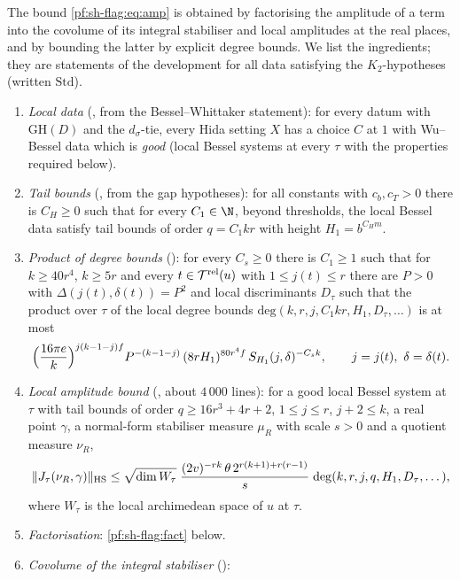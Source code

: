 The bound \eqref{pf:sh-flag:eq:amp} is obtained by factorising the amplitude of a term into the covolume of its integral
stabiliser and local amplitudes at the real places, and by bounding the latter by explicit degree bounds. We list the
ingredients; they are statements of the development for all data satisfying the $K_2$-hypotheses (written $\mathrm{Std}$).
\begin{enumerate}[label=(A\arabic*)]
\item\label{pf:sh-flag:A1} \emph{Local data} (, from the
Bessel--Whittaker statement): for every datum with $\mathrm{GH}(D)$ and the $d_\sigma$-tie, every Hida setting $X$ has a choice
$C$ at $1$ with Wu--Bessel data which is \emph{good} (local Bessel systems at every $\tau$ with the properties required
below).
\item\label{pf:sh-flag:A2} \emph{Tail bounds} (, from the gap
hypotheses): for all constants with $c_b,c_T>0$ there is $C_H\ge0$ such that for every $C_1\in\N$, beyond thresholds, the
local Bessel data satisfy tail bounds of order $q=C_1kr$ with height $H_1=b^{C_Hm}$.
\item\label{pf:sh-flag:A3} \emph{Product of degree bounds} (): for
every $C_s\ge0$ there is $C_1\ge1$ such that for $k\ge40r^4$, $k\ge5r$ and every $t\in\mathcal T^{\mathrm{rel}}(u)$ with $1\le j(t)\le r$ there
are $P>0$ with $\Delta(j(t),\delta(t))=P^2$ and local discriminants $D_\tau$ such that the product over $\tau$ of the local
degree bounds $\mathrm{deg}(k,r,j,C_1kr,H_1,D_\tau,\dots)$ is at most
\[
\Bigl(\frac{16\pi e}k\Bigr)^{j(k-1-j)f}P^{-(k-1-j)}\,(8rH_1)^{80r^4f}\,S_{H_1}(j,\delta)^{-C_sk},\qquad j=j(t),\ \delta=\delta(t).
\]
\item\label{pf:sh-flag:A4} \emph{Local amplitude bound} (,
about $4\,000$ lines): for a good local Bessel system at $\tau$ with tail bounds of order $q\ge16r^3+4r+2$, $1\le j\le r$,
$j+2\le k$, a real point $\gamma$, a normal-form stabiliser measure $\mu_R$ with scale $s>0$ and a quotient measure $\nu_R$,
\[
\|J_\tau(\nu_R,\gamma)\|_{\mathrm{HS}}\le\sqrt{\dim W_\tau}\;\frac{(2v)^{-rk}\,\theta\,2^{r(k+1)+r(r-1)}}s\;
\mathrm{deg}(k,r,j,q,H_1,D_\tau,\dots),
\]
where $W_\tau$ is the local archimedean space of $u$ at $\tau$.
\item\label{pf:sh-flag:A5} \emph{Factorisation}: \cref{pf:sh-flag:fact} below.
\item\label{pf:sh-flag:A6} \emph{Covolume of the integral stabiliser} ():

\end{enumerate}
